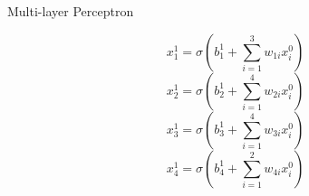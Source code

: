 \documentclass[aspectratio=169]{beamer}
\begin{document}
\begin{frame}{Multi-layer Perceptron}
\begin{figure}
\begin{minipage}{0.65\textwidth}
%
        \end{minipage}%
        \hfill
        \begin{minipage}{0.35\textwidth}
            \vspace{-1cm}
            \[x_{1}^{1} = \sigma\left(b_{1}^{1}+\sum_{i=1}^{3} w_{1i}x_{i}^{0} \right) \]
            \[x_{2}^{1} = \sigma\left(b_{2}^{1}+\sum_{i=1}^{4} w_{2i}x_{i}^{0} \right) \]
            \[x_{3}^{1} = \sigma\left(b_{3}^{1}+\sum_{i=1}^{4} w_{3i}x_{i}^{0} \right) \]
            \[x_{4}^{1} = \sigma\left(b_{4}^{1}+\sum_{i=1}^{2} w_{4i}x_{i}^{0} \right) \]
        \end{minipage}
    \end{figure}
\end{frame}
\end{document}
